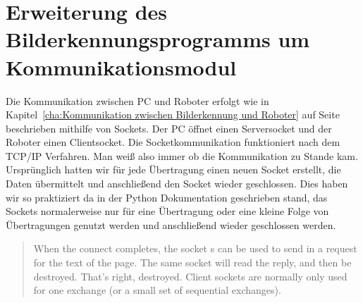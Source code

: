 \section{Erweiterung des Bilderkennungsprogramms um Kommunikationsmodul}
Die Kommunikation zwischen PC und Roboter erfolgt wie in Kapitel~\ref{cha:Kommunikation zwischen Bilderkennung und Roboter} auf Seite~\pageref{cha:Kommunikation zwischen Bilderkennung und Roboter} beschrieben mithilfe von Sockets. Der PC öffnet einen Serversocket und der Roboter einen Clientsocket. Die Socketkommunikation funktioniert nach dem TCP/IP Verfahren. Man weiß also immer ob die Kommunikation zu Stande kam.
Ursprünglich hatten wir für jede Übertragung einen neuen Socket erstellt, die Daten übermittelt und anschließend den Socket wieder geschlossen. Dies haben wir so praktiziert da in der Python Dokumentation geschrieben stand, das Sockets normalerweise nur für eine Übertragung oder eine kleine Folge von Übertragungen genutzt werden und anschließend wieder geschlossen werden.
\begin{quote}
When the connect completes, the socket s can be used to send in a request for the text of the page. The same socket will read the reply, and then be destroyed. That’s right, destroyed. Client sockets are normally only used for one exchange (or a small set of sequential exchanges).\cite{Python-Doku}
\end{quote}
